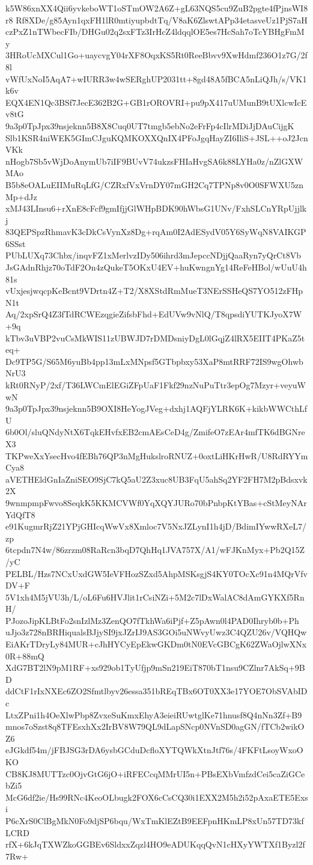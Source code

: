 k5W86xnXX4Qii6yvkeboWT1oSTmOW2A6Z+gL63NQS5cu9ZuB2pgte4fPjnsWI8r8
Rf8XDe/g85Ayn1qxFH1lR0mtiyupbdtTq/V8aK6ZlswtAPp34etasveUz1PjS7aH
czPxZ1nTWbecFIb/DHGu02q2sxFTz3IrHcZ4ldqqlOE5es7HcSah7oTcYBHgFmMy
3HRoUcMXCul1Go+uaycvgY04rXF8OqxKS5Rt0ReeBbvv9XwHdmf236O1z7G/2f8l
vWfUxNoI5AqA7+wIURR3w4wSERghUP2031tt+8gd48A5fBCA5nLiQJh/s/VK1k6v
EQX4EN1Qc3BSf7JecE362B2G+GB1rOROVRI+pu9pX417uUMunB9tUXlcwIcEv8tG
9a3p0TpJpx39nsjeknn5B8X8Cuq0UT7tmgb5ebNo2eFrFp4cIlrMDiJjDAuCijgK
Slb1KSR4niWEK5GImCJguKQMKOXXQnIX4PFoJgqHayZI6IliS+JSL++oJ2JcnVKk
nHogb7Sb5vWjDoAnymUb7iIF9BUvV74ukzsFHIaHvgSA6k88LYHa0z/nZlGXWMAo
B5b8eOALuEIIMuRqLfG/CZRxfVxVrnDY07mGH2Cq7TPNp8v0O0SFWXU5znMp+dJz
xMJ43LInsu6+rXnE8cFcf9gmIfjjGlWHpBDK90hWbsG1UNv/FxhSLCnYRpUjjlkj
83QEPSpzRhmavK3cDkCsVynXz8Dg+rqAm0I2AdESydV05Y6SyWqN8VAIKGP6SSst
PUbLUXq73Chbx/inqvFZ1xMerlvzIDy506ihrd3mJepccNDjjQaaRyn7yQrCt8Vb
JsGAdnRhjz70oTdF2On4zQukeT5OKxU4EV+huKwngnYg14ReFeHBol/wUuU4h81s
vUxjesjwqcpKeBcnt9VDrtn4Z+T2/X8XStdRmMueT3NErSSHeQS7YO512zFHpN1t
Aq/2xpSrQ4Z3fTdRCWEzqgieZifsbFhd+EdUVw9vNlQ/T8qpsdiYUTKJyoX7W+9q
kTbv3uVBP2vuCsMkWIS11zUBWJD7rDMDsniyDgL0lGqjZ4lRX5EIIT4PKaZ5teq+
Dc9TP5G/S65M6yuBb4pp13mLxMNpsf5GTbpbxy53XaP8mtRRF72IS9wgOhwbNrU3
kRt0RNyP/2xf/T36LWCmElEGiZFpUaF1Fkf29nzNuPuTtr3epOg7Mzyr+veyuWwN
9a3p0TpJpx39nsjeknn5B9OXI8HeYogJVeg+dxhj1AQFjYLRK6K+kikbWWCthLfU
6b0Ol/sluQNdyNtX6TqkEHvfxEB2cmAEsCeD4g/ZmifeO7zEAr4mfTK6dBGNreX3
TKPweXxYsecHvo4fEBh76QP3nMgHukslroRNUZ+0oxtLiHKrHwR/U8RdRYYmCya8
aVETHEldGnIaZniSEO9SjC7kQ5aU2Z3xuc8UB3FqU5ahSq2YF2FH7M2pBdsxvk2X
9wnmpmpFwvo8SeqkK5KKMCVWf0YqXQYJURo70bPnbpKtYBas+cStMeyNArYdQfT8
e91KugmrRjZ21YPjGHIcqWwVx8Xmloc7V5NxJZLynI1h4jD/BdimIYwwRXeL7/zp
6tcpdn7N4w/86zrzm08RaRcn3bqD7QhHq1JVA757X/A1/wFJKnMyx+Pb2Q15Z/yC
PELBL/Hzs7NCxUxdGW5IeVFHozSZxd5AhpMSKsgjS4KY0TOcXc91n4MQrVfvDV+F
5V1xh4M5jVU3h/L/oL6Fu6HVJlit1rCsiNZi+5M2c7lDxWalAC8dAmGYKXf5RnH/
PJozoJipKLBtFo2snIzlMz3ZenQO7fTkhWa6iPjf+Z5pAwn0l4PAD0Ihryb0b+Ph
uJjo3z728nBRHiqualsBJjySI9jxJZrIJ9AS3GOi5uNWvyUwz3C4QZU26v/VQHQw
EiAKrTDryLy84MUR+cJhHYCyEpEkwGKDm0tN0EVcGBCgK62ZWaOjlwXNx0R+88mQ
XdG7BT2lN9pM1RF+xs929ob1TyUfjp9mSn219EiT870bT1nsu9CZlnr7AkSq+9BD
ddCtF1rIxNXEc6ZO2Sfmtlbyv26essa351bREqTBx6OT0XX3e17YOE7ObSVAbIDc
LtxZPni1h4OeXlwPbp8ZvxeSuKmxEhyA3eieiRUwtglKe71hnusf8Q4nNn3Zf+B9
mnos7oSzst8q8TFEsxhXx2IrBV8W79QL9dLapSNcp0NVnSD0agGN/fTCb2wikOZ6
eJGkdf54m/jFBJSG3rDA6ysbGCduDcfloXYTQWkXtnJtf76s/4FKFtLsoyWxoOKO
CB8KJ8MUTTzc0OjvGtG6jO+iRFECcqMMrUI5n+PBsEXbVmfzdCei5caZiGCebZi5
McG6df2ie/Hs99RNc4KeoOLbugk2FOX6cCsCQ30i1EXX2M5h2i52pAxaETE5Exsi
P6cXrS0ClBgMkN0Fo9djSP6bqu/WxTmKlEZtB9EEFpnHKmLP8xUn57TD73kfLCRD
rfX+6kJqTXWZkoGGBEv6SldxxZqzl4HO9eADUKqqQvN1cHXyYWTXf1Byzl2f7Rw+
